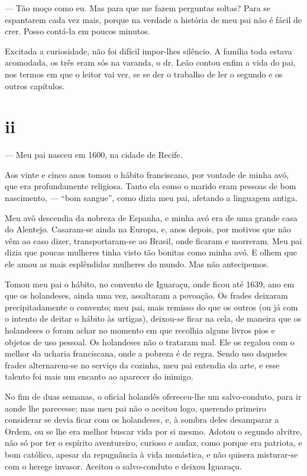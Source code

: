 --- Tão moço como eu. Mas para que me fazem perguntas soltas? Para se
espantarem cada vez mais, porque na verdade a história de meu pai não é
fácil de crer. Posso contá-la em poucos minutos.

Excitada a curiosidade, não foi difícil impor-lhes silêncio. A família
toda estava acomodada, os três eram sós na varanda, o dr. Leão contou
enfim a vida do pai, nos termos em que o leitor vai ver, se se der o
trabalho de ler o segundo e os outros capítulos.



\section*{ii}



--- Meu pai nasceu em 1600, na cidade de Recife.

Aos vinte e cinco anos tomou o hábito franciscano, por vontade de minha
avó, que era profundamente religiosa. Tanto ela como o marido eram
pessoas de bom nascimento, --- ``bom sangue'', como dizia meu pai,
afetando a linguagem antiga.

Meu avô descendia da nobreza de Espanha, e minha avó era de uma grande
casa do Alentejo. Casaram-se ainda na Europa, e, anos depois, por
motivos que não vêm ao caso dizer, transportaram-se ao Brasil, onde
ficaram e morreram. Meu pai dizia que poucas mulheres tinha visto tão
bonitas como minha avó. E olhem que ele amou as mais esplêndidas
mulheres do mundo. Mas não antecipemos.

Tomou meu pai o hábito, no convento de Iguaraçu, onde ficou até 1639,
ano em que os holandeses, ainda uma vez, assaltaram a povoação. Os
frades deixaram precipitadamente o convento; meu pai, mais remisso do
que os outros (ou já com o intento de deitar o hábito às urtigas),
deixou-se ficar na cela, de maneira que os holandeses o foram achar no
momento em que recolhia alguns livros pios e objetos de uso pessoal. Os
holandeses não o trataram mal. Ele os regalou com o melhor da ucharia
franciscana, onde a pobreza é de regra. Sendo uso daqueles frades
alternarem-se no serviço da cozinha, meu pai entendia da arte, e esse
talento foi mais um encanto ao aparecer do inimigo.

No fim de duas semanas, o oficial holandês ofereceu-lhe um
salvo-conduto, para ir aonde lhe parecesse; mas meu pai não o aceitou
logo, querendo primeiro considerar se devia ficar com os holandeses, e,
à sombra deles desamparar a Ordem, ou se lhe era melhor buscar vida por
si mesmo. Adotou o segundo alvitre, não só por ter o espírito
aventureiro, curioso e audaz, como porque era patriota, e bom católico,
apesar da repugnância à vida monástica, e não quisera misturar-se com o
herege invasor. Aceitou o salvo-conduto e deixou Iguaraçu.

